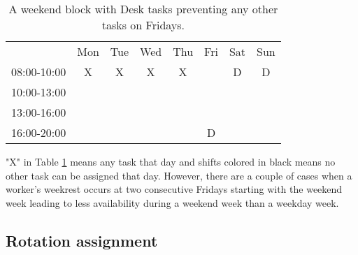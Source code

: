 \begin{table}[!h]
\centering
\caption{A weekend block with Desk tasks preventing any other tasks on Fridays.}
\label{Friday_percolation}
\begin{tabular}{cccccccc}
                                 & Mon                    & Tue                    & Wed                    & Thu                    & Fri                                            & Sat                                            & Sun                                            \\ \cline{2-8} 
\multicolumn{1}{c|}{08:00-10:00} & \multicolumn{1}{c|}{X} & \multicolumn{1}{c|}{X} & \multicolumn{1}{c|}{X} & \multicolumn{1}{c|}{X} & \multicolumn{1}{c|}{\cellcolor[HTML]{000000}}  & \multicolumn{1}{c|}{\cellcolor[HTML]{FCFF2F}D} & \multicolumn{1}{c|}{\cellcolor[HTML]{FCFF2F}D} \\ \cline{2-8} 
\multicolumn{1}{c|}{10:00-13:00} & \multicolumn{1}{c|}{}  & \multicolumn{1}{c|}{}  & \multicolumn{1}{c|}{}  & \multicolumn{1}{c|}{}  & \multicolumn{1}{c|}{\cellcolor[HTML]{000000}}  &                                                &                                                \\ \cline{2-6}
\multicolumn{1}{c|}{13:00-16:00} & \multicolumn{1}{c|}{}  & \multicolumn{1}{c|}{}  & \multicolumn{1}{c|}{}  & \multicolumn{1}{c|}{}  & \multicolumn{1}{c|}{\cellcolor[HTML]{000000}}  &                                                &                                                \\ \cline{2-6}
\multicolumn{1}{c|}{16:00-20:00} & \multicolumn{1}{c|}{}  & \multicolumn{1}{c|}{}  & \multicolumn{1}{c|}{}  & \multicolumn{1}{c|}{}  & \multicolumn{1}{c|}{\cellcolor[HTML]{FCFF2F}D} &                                                &                                                \\ \cline{2-6}
\end{tabular}
\end{table}

 "X" in Table \ref{Friday_percolation} means any task that day and shifts colored in black means no other task can be assigned that day. However, there are a couple of cases when a worker's weekrest occurs at two consecutive Fridays starting with the weekend week leading to less availability during a weekend week than a weekday week. %

\subsection{Rotation assignment} \label{rotation}


